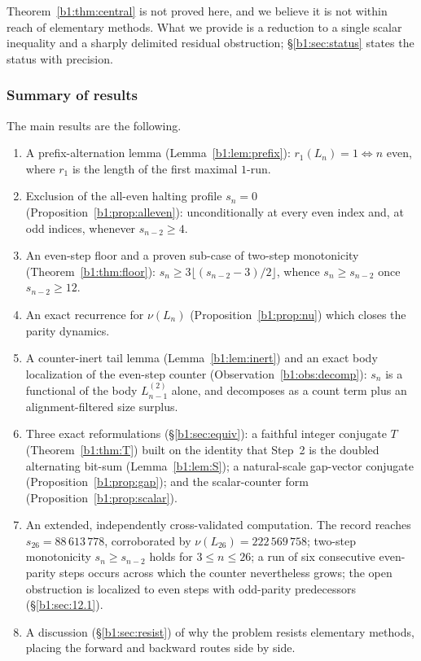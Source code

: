 \documentclass[a4paper]{article}
\theoremstyle{plain}
\theoremstyle{definition}
\theoremstyle{remark}
\begin{document}
Theorem~\ref{b1:thm:central} is not proved here, and we believe it is not within reach of elementary methods. What we provide is a reduction to a single scalar inequality and a sharply delimited residual obstruction; \S\ref{b1:sec:status} states the status with precision.

\subsubsection{Summary of results} The main results are the following.
\begin{enumerate}[label=(\roman*)]
\item A prefix-alternation lemma (Lemma~\ref{b1:lem:prefix}): $r_1(L_n)=1\iff n$ even, where $r_1$ is the length of the first maximal $1$-run.
\item Exclusion of the all-even halting profile $s_n=0$ (Proposition~\ref{b1:prop:alleven}): unconditionally at every even index and, at odd indices, whenever $s_{n-2}\ge 4$.
\item An even-step floor and a proven sub-case of two-step monotonicity (Theorem~\ref{b1:thm:floor}): $s_n\ge 3\lfloor(s_{n-2}-3)/2\rfloor$, whence $s_n\ge s_{n-2}$ once $s_{n-2}\ge 12$.
\item An exact recurrence for $\nu(L_n)$ (Proposition~\ref{b1:prop:nu}) which closes the parity dynamics.
\item A counter-inert tail lemma (Lemma~\ref{b1:lem:inert}) and an exact body localization of the even-step counter (Observation~\ref{b1:obs:decomp}): $s_n$ is a functional of the body $L^{(2)}_{n-1}$ alone, and decomposes as a count term plus an alignment-filtered size surplus.
\item Three exact reformulations (\S\ref{b1:sec:equiv}): a faithful integer conjugate $T$ (Theorem~\ref{b1:thm:T}) built on the identity that Step~2 is the doubled alternating bit-sum (Lemma~\ref{b1:lem:S}); a natural-scale gap-vector conjugate (Proposition~\ref{b1:prop:gap}); and the scalar-counter form (Proposition~\ref{b1:prop:scalar}).
\item An extended, independently cross-validated computation. The record reaches $s_{26}=88\,613\,778$, corroborated by $\nu(L_{26})=222\,569\,758$; two-step monotonicity $s_n\ge s_{n-2}$ holds for $3\le n\le 26$; a run of six consecutive even-parity steps occurs across which the counter nevertheless grows; the open obstruction is localized to even steps with odd-parity predecessors (\S\ref{b1:sec:12.1}).
\item A discussion (\S\ref{b1:sec:resist}) of why the problem resists elementary methods, placing the forward and backward routes side by side.
\end{enumerate}
\end{document}
